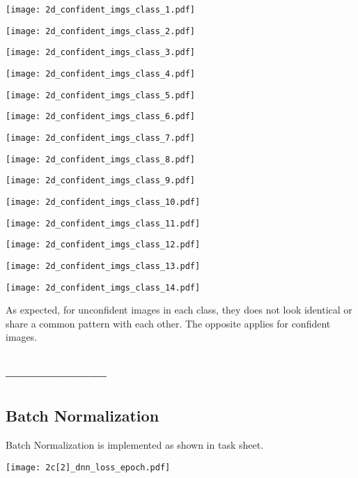 \documentclass[11pt]{article}
\begin{document}
\texttt{[image: 2d\_confident\_imgs\_class\_1.pdf]}

\texttt{[image: 2d\_confident\_imgs\_class\_2.pdf]}

\texttt{[image: 2d\_confident\_imgs\_class\_3.pdf]}

\texttt{[image: 2d\_confident\_imgs\_class\_4.pdf]}

\texttt{[image: 2d\_confident\_imgs\_class\_5.pdf]}

\texttt{[image: 2d\_confident\_imgs\_class\_6.pdf]}

\texttt{[image: 2d\_confident\_imgs\_class\_7.pdf]}

\texttt{[image: 2d\_confident\_imgs\_class\_8.pdf]}

\texttt{[image: 2d\_confident\_imgs\_class\_9.pdf]}

\texttt{[image: 2d\_confident\_imgs\_class\_10.pdf]}

\texttt{[image: 2d\_confident\_imgs\_class\_11.pdf]}

\texttt{[image: 2d\_confident\_imgs\_class\_12.pdf]}

\texttt{[image: 2d\_confident\_imgs\_class\_13.pdf]}

\texttt{[image: 2d\_confident\_imgs\_class\_14.pdf]}

As expected, for unconfident images in each class, they does not look identical or share a common pattern with each other. The opposite applies for confident images.

\subsection{------------------}

\subsection{Batch Normalization}

Batch Normalization is implemented as shown in task sheet.

\texttt{[image: 2c[2]\_dnn\_loss\_epoch.pdf]}


\end{document}
